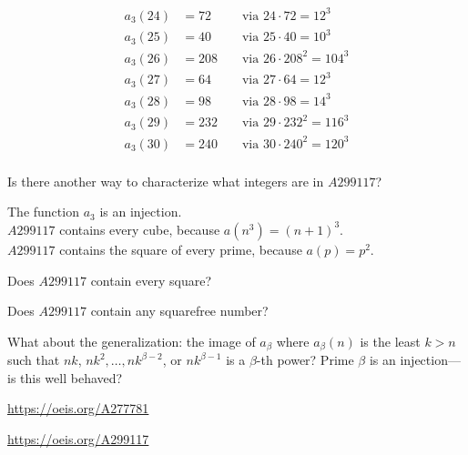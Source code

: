 \documentclass{article}
\begin{document}
\begin{multicols}{3}
\begin{alignat*}{2}
      a_3(24) &= 72  &&\text{ via } 24 \cdot 72    = 12^3 \\
      a_3(25) &= 40  &&\text{ via } 25 \cdot 40    = 10^3 \\
      a_3(26) &= 208 &&\text{ via } 26 \cdot 208^2 = 104^3 \\
      a_3(27) &= 64  &&\text{ via } 27 \cdot 64    = 12^3 \\
      a_3(28) &= 98  &&\text{ via } 28 \cdot 98    = 14^3 \\
      a_3(29) &= 232 &&\text{ via } 29 \cdot 232^2 = 116^3 \\
      a_3(30) &= 240 &&\text{ via } 30 \cdot 240^2 = 120^3 \\
    \end{alignat*}
  \end{multicols}
\begin{question}
  Is there another way to characterize what integers are in $A299117$?
\end{question}

\begin{note}
  The function $a_3$ is an injection.\\
  $A299117$ contains every cube, because $a(n^3) = (n + 1)^3$.\\
  $A299117$ contains the square of every prime, because $a(p) = p^2$.
\end{note}

\begin{related}
  \item Does $A299117$ contain every square?
  \item Does $A299117$ contain any squarefree number?
  \item What about the generalization: the image of $a_\beta$ where $a_\beta(n)$
    is the least $k > n$ such that $nk$, $nk^2, \hdots, nk^{\beta-2}$, or $nk^{\beta-1}$
    is a $\beta$-th power? Prime $\beta$ is an injection---is this well behaved?
\end{related}

\begin{references}
  \item \url{https://oeis.org/A277781}
  \item \url{https://oeis.org/A299117}
\end{references}
\end{document}
